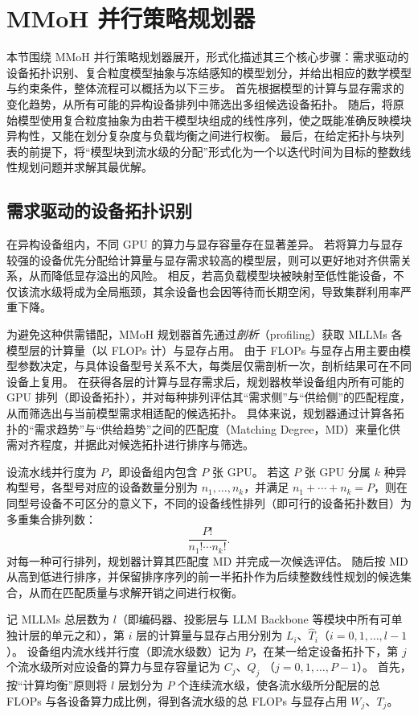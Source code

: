 \section{MMoH 并行策略规划器}

本节围绕 MMoH 并行策略规划器展开，形式化描述其三个核心步骤：需求驱动的设备拓扑识别、复合粒度模型抽象与冻结感知的模型划分，并给出相应的数学模型与约束条件，整体流程可以概括为以下三步。
首先根据模型的计算与显存需求的变化趋势，从所有可能的异构设备排列中筛选出多组候选设备拓扑。
随后，将原始模型使用复合粒度抽象为由若干模型块组成的线性序列，使之既能准确反映模块异构性，又能在划分复杂度与负载均衡之间进行权衡。
最后，在给定拓扑与块列表的前提下，将“模型块到流水级的分配”形式化为一个以迭代时间为目标的整数线性规划问题并求解其最优解。

\subsection{需求驱动的设备拓扑识别}

在异构设备组内，不同 GPU 的算力与显存容量存在显著差异。
若将算力与显存较强的设备优先分配给计算量与显存需求较高的模型层，则可以更好地对齐供需关系，从而降低显存溢出的风险。
相反，若高负载模型块被映射至低性能设备，不仅该流水级将成为全局瓶颈，其余设备也会因等待而长期空闲，导致集群利用率严重下降。

为避免这种供需错配，MMoH 规划器首先通过\emph{剖析}（profiling）获取 MLLMs 各模型层的计算量（以 FLOPs 计）与显存占用。
由于 FLOPs 与显存占用主要由模型参数决定，与具体设备型号关系不大，每类层仅需剖析一次，剖析结果可在不同设备上复用。
在获得各层的计算与显存需求后，规划器枚举设备组内所有可能的 GPU 排列（即设备拓扑），并对每种排列评估其“需求侧”与“供给侧”的匹配程度，从而筛选出与当前模型需求相适配的候选拓扑。
具体来说，规划器通过计算各拓扑的“需求趋势”与“供给趋势”之间的匹配度（Matching Degree，MD）来量化供需对齐程度，并据此对候选拓扑进行排序与筛选。

设流水线并行度为 $P$，即设备组内包含 $P$ 张 GPU。
若这 $P$ 张 GPU 分属 $k$ 种异构型号，各型号对应的设备数量分别为 $n_1,\ldots,n_k$，并满足 $n_1+\cdots+n_k=P$，则在同型号设备不可区分的意义下，不同的设备线性排列（即可行的设备拓扑数目）为多重集合排列数：
\[
  \frac{P!}{n_1!\cdots n_k!}.
\]
对每一种可行排列，规划器计算其匹配度 $\mathrm{MD}$ 并完成一次候选评估。
随后按 $\mathrm{MD}$ 从高到低进行排序，并保留排序序列的前一半拓扑作为后续整数线性规划的候选集合，从而在匹配质量与求解开销之间进行权衡。

记 MLLMs 总层数为 $l$（即编码器、投影层与 LLM Backbone 等模块中所有可单独计层的单元之和），第 $i$ 层的计算量与显存占用分别为 $L_i$、$\hat{T}_i$（$i = 0, 1, \ldots, l-1$）。
设备组内流水线并行度（即流水级数）记为 $P$，在某一给定设备拓扑下，第 $j$ 个流水级所对应设备的算力与显存容量记为 $C_j$、$Q_j$
（$j = 0, 1, \ldots, P-1$）。
首先，按“计算均衡”原则将 $l$ 层划分为 $P$ 个连续流水级，使各流水级所分配层的总 FLOPs 与各设备算力成比例，得到各流水级的总 FLOPs 与显存占用 $W_j$、$T_j$。


